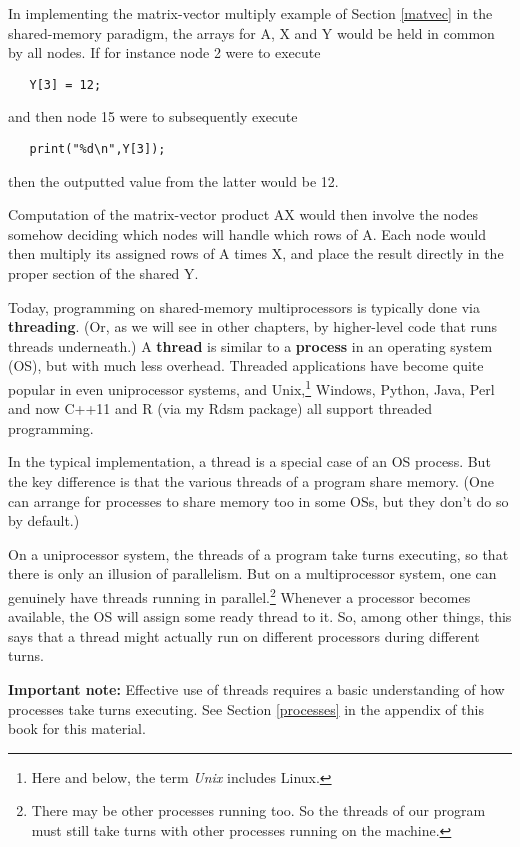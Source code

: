 In implementing the matrix-vector multiply example of Section
\ref{matvec} in the shared-memory paradigm, the arrays for A, X and Y
would be held in common by all nodes. If for instance node 2 were to
execute

\begin{Verbatim}
   Y[3] = 12;
\end{Verbatim}

and then node 15 were to subsequently execute

\begin{Verbatim}
   print("%d\n",Y[3]);
\end{Verbatim}

then the outputted value from the latter would be 12.

Computation of the matrix-vector product AX would then involve the nodes
somehow deciding which nodes will handle which rows of A.  Each node
would then multiply its assigned rows of A times X, and place the result
directly in the proper section of the shared Y.

Today, programming on shared-memory multiprocessors is typically done
via \textbf{threading}.  (Or, as we will see in other chapters, by
higher-level code that runs threads underneath.) A \textbf{thread} is
similar to a \textbf{process} in an operating system (OS), but with much
less overhead.  Threaded applications have become quite popular in even
uniprocessor systems, and Unix,\footnote{Here and below, the term {\it
Unix} includes Linux.} Windows, Python, Java, Perl and now C++11 and R
(via my Rdsm package) all support threaded programming.

In the typical implementation, a thread is a special case of an OS
process.  But the key difference is that the various threads of a
program share memory.  (One can arrange for processes to share memory
too in some OSs, but they don't do so by default.)

On a uniprocessor system, the threads of a program take turns executing,
so that there is only an illusion of parallelism.  But on a
multiprocessor system, one can genuinely have threads running in
parallel.\footnote{There may be other processes running too.  So the
threads of our program must still take turns with other processes
running on the machine.}  Whenever a processor becomes available, the OS
will assign some ready thread to it.  So, among other things, this says
that a thread might actually run on different processors during
different turns.

\label{needknowos}
{\bf Important note:}  Effective use of threads requires a basic
understanding of how processes take turns executing.  See Section
\ref{processes} in the appendix of this book for this material.

